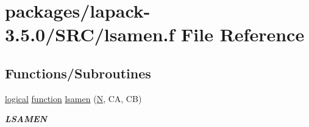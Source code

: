 \hypertarget{lsamen_8f}{}\section{packages/lapack-\/3.5.0/\+S\+R\+C/lsamen.f File Reference}
\label{lsamen_8f}
\subsection*{Functions/\+Subroutines}
\begin{DoxyCompactItemize}
\item 
\hyperlink{tnc_8c_aa7b64cdf39500931f7b333343791a104}{logical} \hyperlink{afunc_8m_a7b5e596df91eadea6c537c0825e894a7}{function} \hyperlink{group__auxOTHERauxiliary_ga0b496168bf04278e5e57050403c150aa}{lsamen} (\hyperlink{polmisc_8c_a0240ac851181b84ac374872dc5434ee4}{N}, C\+A, C\+B)
\begin{DoxyCompactList}\small\item\em {\bfseries L\+S\+A\+M\+E\+N} \end{DoxyCompactList}\end{DoxyCompactItemize}

